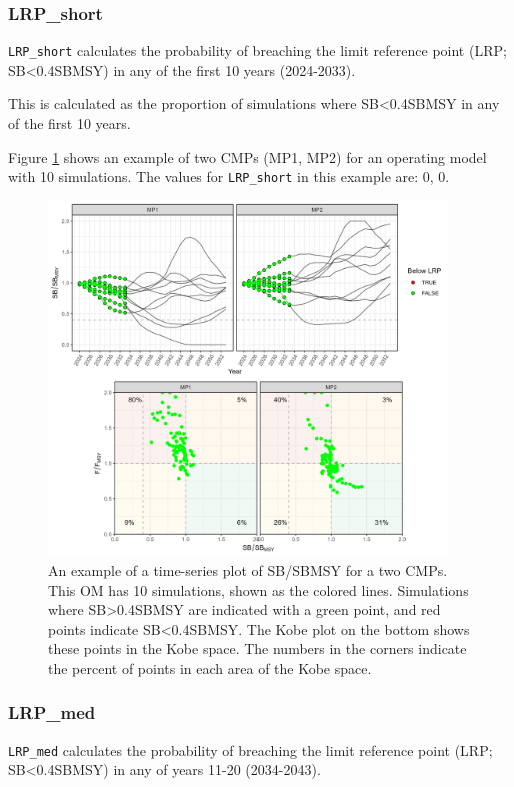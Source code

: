 \documentclass[
]{article}
\begin{document}
\hypertarget{lrp_short}{%
\subsubsection{LRP\_short}\label{lrp_short}}

\texttt{LRP\_short} calculates the probability of breaching the limit reference point (LRP; SB\textless0.4SBMSY) in any of the first 10 years (2024-2033).

This is calculated as the proportion of simulations where SB\textless0.4SBMSY in any of the first 10 years.

Figure \ref{fig:LRPshort} shows an example of two CMPs (MP1, MP2) for an operating model with 10 simulations. The values for \texttt{LRP\_short} in this example are: 0, 0.

\begin{figure}
\includegraphics[width=400px]{../../img/PMs/LRP_short} \caption{An example of a time-series plot of SB/SBMSY for a two CMPs. This OM has 10 simulations, shown as the colored lines. Simulations where SB>0.4SBMSY are indicated with a green point, and red points indicate SB<0.4SBMSY. The Kobe plot on the bottom shows these points in the Kobe space. The numbers in the corners indicate the percent of points in each area of the Kobe space.}\label{fig:LRPshort}
\end{figure}

\hypertarget{lrp_med}{%
\subsubsection{LRP\_med}\label{lrp_med}}

\texttt{LRP\_med} calculates the probability of breaching the limit reference point (LRP; SB\textless0.4SBMSY) in any of years 11-20 (2034-2043).
\end{document}
